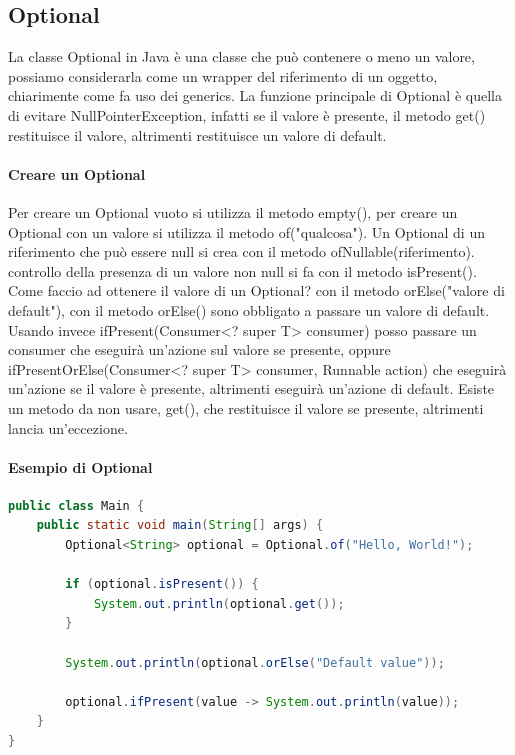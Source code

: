 \documentclass[11pt]{article}
\begin{document}
\subsection{Optional}
La classe Optional in Java è una classe che può contenere o meno un valore, possiamo considerarla come un wrapper del riferimento di un oggetto, chiarimente come fa uso dei generics.
La funzione principale di Optional è quella di evitare NullPointerException, infatti se il valore è presente, il metodo get() restituisce il valore, altrimenti restituisce un valore di default.
\paragraph{Creare un Optional}
Per creare un Optional vuoto si utilizza il metodo empty(), per creare un Optional con un valore si utilizza il metodo of("qualcosa").
Un Optional di un riferimento che può essere null si crea con il metodo ofNullable(riferimento).
controllo della presenza di un valore non null si fa con il metodo isPresent().
Come faccio ad ottenere il valore di un Optional? con il metodo orElse("valore di default"), con il metodo orElse() sono obbligato a passare un valore di default.
Usando invece ifPresent(Consumer<? super T> consumer) posso passare un consumer che eseguirà un'azione sul valore se presente, oppure ifPresentOrElse(Consumer<? super T> consumer, Runnable action) che eseguirà un'azione se il valore è presente, altrimenti eseguirà un'azione di default.
Esiste un metodo da non usare, get(), che restituisce il valore se presente, altrimenti lancia un'eccezione.
\paragraph{Esempio di Optional}
\begin{lstlisting}[language=Java]
public class Main {
    public static void main(String[] args) {
        Optional<String> optional = Optional.of("Hello, World!");

        if (optional.isPresent()) {
            System.out.println(optional.get());
        }

        System.out.println(optional.orElse("Default value"));

        optional.ifPresent(value -> System.out.println(value));
    }
}
\end{lstlisting}
\end{document}
